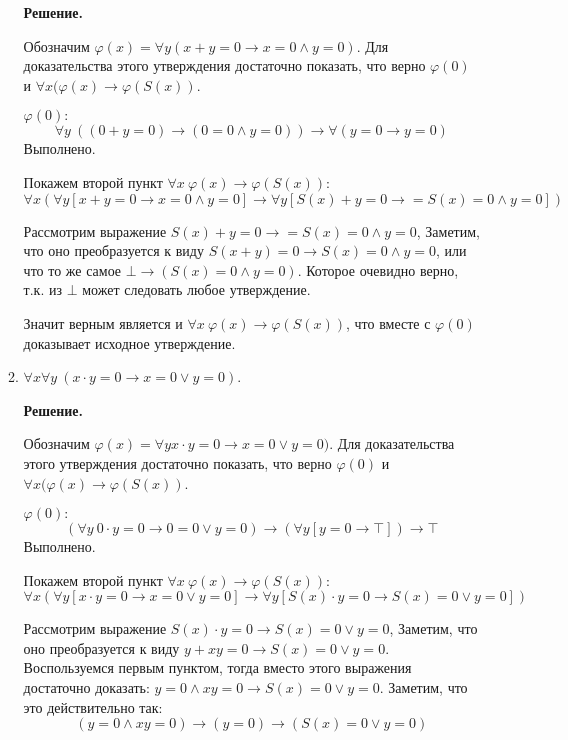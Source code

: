 \begin{enumerate}
\begin{enumerate}
\textbf{Решение.} 

Обозначим $\varphi(x) = \forall y (x + y = 0 \to x = 0 \land y = 0)$. Для доказательства этого утверждения 
достаточно показать, что верно $\varphi(0)$ и $\forall x (\varphi(x) \to \varphi(S(x))$.

$\varphi(0):$ 
\begin{equation*}
\forall y \ ((0 + y = 0) \to (0 = 0 \land y = 0)) \to \forall (y = 0 \to y = 0)
\end{equation*}
Выполнено.

Покажем второй пункт  $\forall x \ \varphi(x) \to \varphi(S(x))$:
\begin{equation*}
\forall x (\forall y [x + y = 0 \to x = 0 \land y = 0] \to \forall y [S(x) + y = 0 \to  = S(x) = 0 \land y = 0])
\end{equation*}

Рассмотрим выражение $S(x) + y = 0 \to  = S(x) = 0 \land y = 0$, Заметим, что оно преобразуется к виду $S(x + 
y) = 0 \to S(x) = 0 \land y = 0$, или что то же самое $\bot \to (S(x) = 0 \land y = 0)$. Которое очевидно 
верно, т.к. из $\bot$ может следовать любое утверждение. 

Значит верным является и $\forall x \ \varphi(x) \to \varphi(S(x))$, что вместе с $\varphi(0)$ доказывает 
исходное утверждение.

\item $\forall x \forall y\ (x \cdot y = 0 \to x = 0 \lor y = 0)$.

\textbf{Решение.} 

Обозначим $\varphi(x) = \forall y x \cdot y = 0 \to x = 0 \lor y = 0)$. Для доказательства этого утверждения 
достаточно показать, что верно $\varphi(0)$ и $\forall x (\varphi(x) \to \varphi(S(x))$.

$\varphi(0):$ 
\begin{equation*}
(\forall y \ 0 \cdot y = 0 \to 0 = 0 \lor y = 0) \to (\forall y [y = 0 \to \top]) \to \top 
\end{equation*}
Выполнено.

Покажем второй пункт  $\forall x \ \varphi(x) \to \varphi(S(x))$:
\begin{equation*}
\forall x (\forall y [x \cdot y = 0 \to x = 0 \lor y = 0] \to \forall y [S(x) \cdot y = 0 \to S(x) = 0 \lor y = 0])
\end{equation*}

Рассмотрим выражение $S(x) \cdot y = 0 \to S(x) = 0 \lor y = 0$, Заметим, что оно преобразуется к виду $y + xy = 
0 \to S(x) = 0 \lor y = 0$. Воспользуемся первым пунктом, тогда вместо этого выражения достаточно доказать: $y = 
0 \land xy = 0 \to S(x) = 0 \lor y = 0$. Заметим, что это действительно так: 
\begin{equation*}
(y = 0 \land xy = 0) \to (y = 0) \to (S(x) = 0 \lor y = 0)
\end{equation*}


\end{enumerate}
\end{enumerate}
